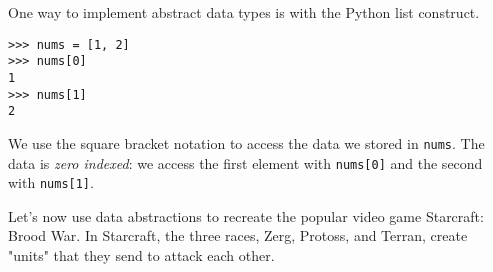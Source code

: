 One way to implement abstract data types is with the Python list construct.

\begin{lstlisting}
>>> nums = [1, 2]
>>> nums[0]
1
>>> nums[1]
2
\end{lstlisting}

We use the square bracket notation to access the data we stored in
\texttt{nums}.  The data is \textit{zero indexed}: we access the first
element with {\tt nums[0]} and the second with {\tt nums[1]}.

Let's now use data abstractions to recreate the popular video game Starcraft:
Brood War.  In Starcraft, the three races, Zerg, Protoss, and Terran, create
"units" that they send to attack each other.
